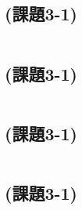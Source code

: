 \documentclass[a4j]{jarticle}
\begin{document}
\subsection{(課題3-1) }
\label{sec:}
\small{
\begin{verbatim}

\end{verbatim}
}

\subsection{(課題3-1) }
\label{sec:}
\small{
\begin{verbatim}

\end{verbatim}
}

\subsection{(課題3-1) }
\label{sec:}
\small{
\begin{verbatim}

\end{verbatim}
}

\subsection{(課題3-1) }
\label{sec:}
\small{
\begin{verbatim}

\end{verbatim}
}
\end{document}

